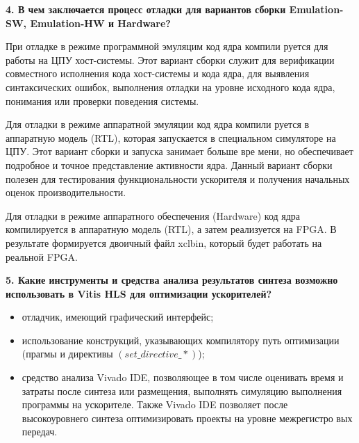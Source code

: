 \textbf{4. В чем заключается процесс отладки для вариантов сборки Emulation-SW, Emulation-HW и Hardware?}

При отладке в режиме программной эмуляцим код ядра компили­
руется для работы на ЦПУ хост-системы. Этот вариант сборки служит
для верификации совместного исполнения кода хост-системы и кода ядра, для выявления синтаксических ошибок, выполнения отладки на уровне
исходного кода ядра, понимания или проверки поведения системы.

Для отладки в режиме аппаратной эмуляции код ядра компили­
руется в аппаратную модель (RTL), которая запускается в специальном
симуляторе на ЦПУ. Этот вариант сборки и запуска занимает больше вре­
мени, но обеспечивает подробное и точное представление активности ядра.
Данный вариант сборки полезен для тестирования функциональности
ускорителя и получения начальных оценок производительности.

Для отладки в режиме аппаратного обеспечения (Hardware) код
ядра компилируется в аппаратную модель (RTL), а затем реализуется на
FPGA. В результате формируется двоичный файл xclbin, который будет
работать на реальной FPGA.



\textbf{5. Какие инструменты и средства анализа результатов синтеза возможно использовать в Vitis HLS для оптимизации ускорителей?}

\begin{itemize}
	\item отладчик, имеющий графический интерфейс;
	\item использование конструкций, указывающих компилятору путь оптимизации (прагмы и директивы $(set\_directive\_*)$);
	\item средство анализа Vivado IDE, позволяющее в том числе оценивать
	время и затраты после синтеза или размещения, выполнять симуляцию
	выполнения программы на ускорителе. Также Vivado IDE позволяет после
	высокоуровнего синтеза оптимизировать проекты на уровне межрегистро­
	вых передач.
\end{itemize}
